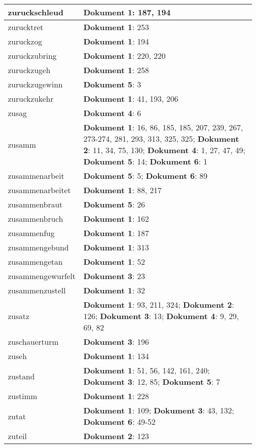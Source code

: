 \documentclass[a5paper]{article}
\begin{document}
\begin{longtable}[l]{|l|p{3in}|}
\hline
zuruckschleud & \textbf{Dokument 1}: 187, 194 \\
\hline
zurucktret & \textbf{Dokument 1}: 253 \\
\hline
zuruckzog & \textbf{Dokument 1}: 194 \\
\hline
zuruckzubring & \textbf{Dokument 1}: 220, 220 \\
\hline
zuruckzugeh & \textbf{Dokument 1}: 258 \\
\hline
zuruckzugewinn & \textbf{Dokument 5}: 3 \\
\hline
zuruckzukehr & \textbf{Dokument 1}: 41, 193, 206 \\
\hline
zusag & \textbf{Dokument 4}: 6 \\
\hline
zusamm & \textbf{Dokument 1}: 16, 86, 185, 185, 207, 239, 267, 273-274, 281, 293, 313, 325, 325; \textbf{Dokument 2}: 11, 34, 75, 130; \textbf{Dokument 4}: 1, 27, 47, 49; \textbf{Dokument 5}: 14; \textbf{Dokument 6}: 1 \\
\hline
zusammenarbeit & \textbf{Dokument 5}: 5; \textbf{Dokument 6}: 89 \\
\hline
zusammenarbeitet & \textbf{Dokument 1}: 88, 217 \\
\hline
zusammenbraut & \textbf{Dokument 5}: 26 \\
\hline
zusammenbruch & \textbf{Dokument 1}: 162 \\
\hline
zusammenfug & \textbf{Dokument 1}: 187 \\
\hline
zusammengebund & \textbf{Dokument 1}: 313 \\
\hline
zusammengetan & \textbf{Dokument 1}: 52 \\
\hline
zusammengewurfelt & \textbf{Dokument 3}: 23 \\
\hline
zusammenzustell & \textbf{Dokument 1}: 32 \\
\hline
zusatz & \textbf{Dokument 1}: 93, 211, 324; \textbf{Dokument 2}: 126; \textbf{Dokument 3}: 13; \textbf{Dokument 4}: 9, 29, 69, 82 \\
\hline
zuschauerturm & \textbf{Dokument 3}: 196 \\
\hline
zuseh & \textbf{Dokument 1}: 134 \\
\hline
zustand & \textbf{Dokument 1}: 51, 56, 142, 161, 240; \textbf{Dokument 3}: 12, 85; \textbf{Dokument 5}: 7 \\
\hline
zustimm & \textbf{Dokument 1}: 228 \\
\hline
zutat & \textbf{Dokument 1}: 109; \textbf{Dokument 3}: 43, 132; \textbf{Dokument 6}: 49-52 \\
\hline
zuteil & \textbf{Dokument 2}: 123 \\

\end{longtable}
\end{document}
